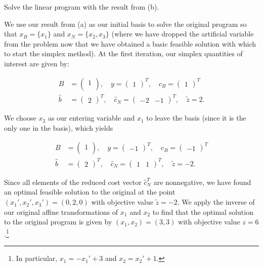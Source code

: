 Solve the linear program with the result from (b).

\begin{solution}

    We use our result from (a) as our initial basis to solve the original program so that $x_B = \{ x_1 \}$ and 
    $x_N = \{ x_2, x_3 \}$ (where we have dropped the artificial variable from the problem now that we have obtained a
    basic feasible solution with which to start the simplex method). At the first iteration, our simplex quantities of 
    interest are given by:

    \begin{align*}
      B &= \begin{pmatrix}
        1  \\
      \end{pmatrix}, \quad y = \begin{pmatrix}
        1 
      \end{pmatrix}^T, \quad c_B = \begin{pmatrix}
        1
      \end{pmatrix}^T \\
      \hat{b} &= \begin{pmatrix}
        2
      \end{pmatrix}^T, \quad \hat{c}_N = \begin{pmatrix}
        -2 & -1 
      \end{pmatrix}^T, \quad \tilde{z} = 2.
    \end{align*}

    We choose $x_2$ as our entering variable and $x_1$ to leave the basis (since it is the only one in the basis),
    which yields

    \begin{align*}
      B &= \begin{pmatrix}
        1  \\
      \end{pmatrix}, \quad y = \begin{pmatrix}
       -1 
      \end{pmatrix}^T, \quad c_B = \begin{pmatrix}
       -1
      \end{pmatrix}^T \\
      \hat{b} &= \begin{pmatrix}
        2
      \end{pmatrix}^T, \quad \hat{c}_N = \begin{pmatrix}
        1 & 1
      \end{pmatrix}^T, \quad \tilde{z} = -2.
    \end{align*}

    Since all elements of the reduced cost vector $\hat{c}_N^T$ are nonnegative, we have found an optimal feasible 
    solution to the original at the point $(x_1', x_2', x_3') = (0, 2, 0)$ with objective value $\tilde{z} = -2$. We 
    apply the inverse of our original affine transformations of $x_1$ and $x_2$ to find that the optimal solution to the 
    original program is given by $(x_1, x_2) = (3, 3)$ with objective value $z = 6$.\footnote{
      In particular, $x_1 = -x_1' + 3$ and $x_2 = x_2' + 1$.
    }

\end{solution}